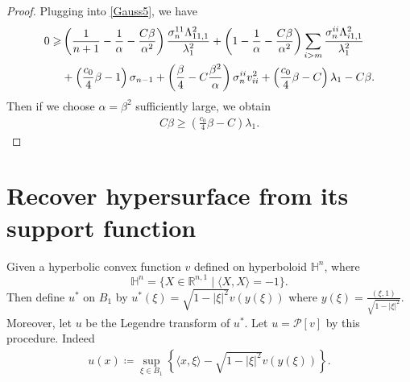 \documentclass[reqno]{amsart}
\theoremstyle{remark}
\theoremstyle{definition}
\numberwithin{equation}{section}
\begin{document}
\begin{proof}
    Plugging into \eqref{Gauss5}, we have
    \begin{align}
        0 \geqslant& 
        \left( \frac{1}{n+1} - \frac{1}{\alpha} - \frac{C\beta}{\alpha^2} \right) \frac{\sigma_n^{11}\Lambda^2_{11,1}}{\lambda_1^2} 
        + \left( 1 - \frac{1}{\alpha} - \frac{C\beta}{\alpha^2} \right) \sum_{i > m} \frac{\sigma_n^{ii}\Lambda^2_{i1,1}}{\lambda_1^2} 
        \notag \\
        &+ \left( \frac{c_0}{4}\beta - 1 \right) \sigma_{n-1} 
        + \left( \frac{\beta}{4} - C \frac{\beta^2}{\alpha} \right)\sigma_n^{ii}v_{ii}^2 + \left( \frac{c_0}{4}\beta - C \right) \lambda_1 -C \beta.
    \end{align}
    Then if we choose $\alpha = \beta^2$ sufficiently large, we obtain
    \begin{align}
        C\beta \geqslant \left( \frac{c_0}{4}\beta - C \right) \lambda_1.
    \end{align}
\end{proof}


\section{Recover hypersurface from its support function}\label{Recover hypersurface from its support function}


Given a hyperbolic convex function $v$ defined on hyperboloid $\mathbb{H}^n$, where
\[
\mathbb{H}^n = \{X \in \mathbb{R}^{n,1} \mid \langle X, X \rangle = -1\}.
\]
Then define $u^*$ on $B_1$ by $u^*(\xi) = \sqrt{1 - |\xi|^2} v(y(\xi))$ where $y(\xi) = \frac{(\xi, 1)}{\sqrt{1 - |\xi|^2}}$. Moreover, let $u$ be the Legendre transform of $u^*$. Let $u = \mathscr{P}[v]$ by this procedure. Indeed
\begin{align*}
    u(x) \coloneqq \sup_{\xi \in B_1} \left\{ \langle x, \xi \rangle - \sqrt{1 - |\xi |^2} v(y(\xi)) \right\}.
\end{align*}
\end{document}
